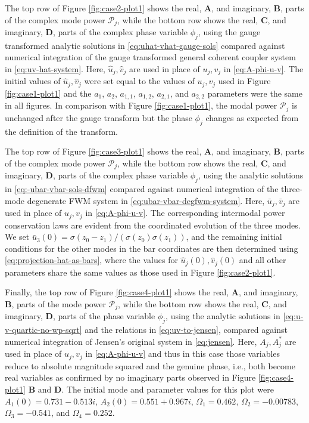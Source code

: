 \documentclass[11pt,a4paper]{article}
\numberwithin{equation}{section}
\begin{document}
The top row of Figure \ref{fig:case2-plot1} shows the real, \textbf{A}, and imaginary, \textbf{B}, parts of the complex mode power $\mathcal{P}_j$,  
while the bottom row shows the real, \textbf{C}, and imaginary, \textbf{D}, parts of the complex phase variable $\phi_j$, using the gauge transformed analytic solutions in \eqref{eq:uhat-vhat-gauge-sols} compared against numerical integration of the gauge transformed general coherent coupler system in \eqref{eq:uv-hat-system}.
Here, $\hat{u}_j, \hat{v}_j$ are used in place of $u_j, v_j$ in \eqref{eq:A-phi-u-v}.
The initial values of $\hat{u}_j, \hat{v}_j$ were set equal to the values of $u_j, v_j$ used in Figure \ref{fig:case1-plot1} and the $a_1$, $a_2$, $a_{1,1}$, $a_{1,2}$, $a_{2,1}$, and $a_{2,2}$ parameters were the same in all figures.
In comparison with Figure \ref{fig:case1-plot1}, the modal power $\mathcal{P}_j$ is unchanged after the gauge transform but the phase $\phi_j$ changes as expected from the definition of the transform.

The top row of Figure \ref{fig:case3-plot1} shows the real, \textbf{A}, and imaginary, \textbf{B}, parts of the complex mode power $\mathcal{P}_j$,  
while the bottom row shows the real, \textbf{C}, and imaginary, \textbf{D}, parts of the complex phase variable $\phi_j$, using the analytic solutions in \eqref{eq:-ubar-vbar-sols-dfwm} compared against numerical integration of the three-mode degenerate FWM system in \eqref{eq:ubar-vbar-degfwm-system}.
Here, $\bar{u}_j, \bar{v}_j$ are used in place of $u_j, v_j$ in \eqref{eq:A-phi-u-v}.
The corresponding intermodal power conservation laws are evident from the coordinated evolution of the three modes.
We set $\bar{u}_3(0)=\sigma(z_0 - z_1)/\left(\sigma(z_0)\sigma(z_1)\right)$, and the remaining initial conditions for the other modes in the bar coordinates are then determined using \eqref{eq:projection-hat-as-bars}, where the values for $\hat{u}_j(0), \hat{v}_j(0)$ and all other parameters share the same values as those used in Figure \ref{fig:case2-plot1}.

Finally, the top row of Figure \ref{fig:case4-plot1} shows the real, \textbf{A}, and imaginary, \textbf{B}, parts of the mode power $\mathcal{P}_j$,  
while the bottom row shows the real, \textbf{C}, and imaginary, \textbf{D}, parts of the phase variable $\phi_j$, using the analytic solutions in \eqref{eq:u-v-quartic-no-wp-sqrt} and the relations in \eqref{eq:uv-to-jensen}, compared against numerical integration of Jensen's original system in \eqref{eq:jensen}.
Here, $A_j, A^{*}_j$ are used in place of $u_j, v_j$ in \eqref{eq:A-phi-u-v} and thus in this case those variables reduce to absolute magnitude squared and the genuine phase, i.e., both become real variables as confirmed by no imaginary parts observed in Figure \ref{fig:case4-plot1} \textbf{B} and \textbf{D}.
The initial mode and parameter values for this plot were $A_1(0)=0.731-0.513i$, $A_2(0)=0.551+0.967i$, $\Omega_1=0.462$, $\Omega_2=-0.00783$, $\Omega_3=-0.541$, and $\Omega_4=0.252$.
\end{document}
